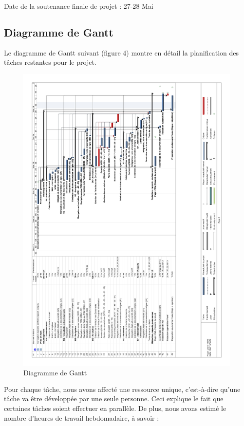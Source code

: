 \documentclass[a4paper]{article}
\begin{document}
	Date de la soutenance finale de projet : 27-28 Mai\\

\subsection{Diagramme de Gantt}

	Le diagramme de Gantt suivant (figure 4) montre en détail la planification des tâches restantes pour le projet.

\begin{figure}[H]
\centering
\includegraphics[width=\textwidth]{gantt.png}
\caption{Diagramme de Gantt}
\label{fig:gantt}
\end{figure}

\newpage

	Pour chaque tâche, nous avons affecté une ressource unique, c'est-à-dire qu'une tâche va être développée par une seule personne. Ceci explique le fait que certaines tâches soient effectuer en parallèle. De plus, nous avons estimé le nombre d'heures de travail hebdomadaire, à savoir : 
	
\end{document}
